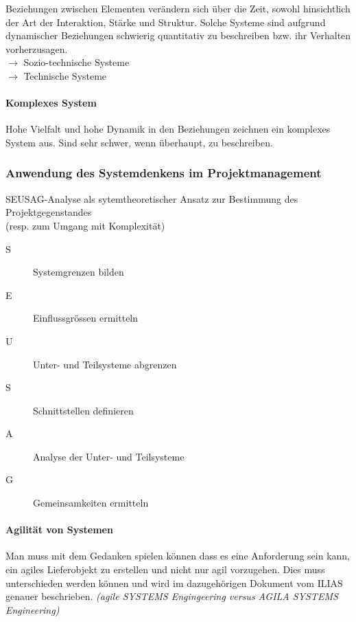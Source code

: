 \documentclass[a4paper]{article}
\begin{document}
			Beziehungen zwischen Elementen verändern sich über die Zeit, sowohl hinsichtlich der Art der Interaktion, Stärke und Struktur.
			Solche Systeme sind aufgrund dynamischer Beziehungen schwierig quantitativ zu beschreiben bzw. ihr Verhalten vorherzusagen.\\
			$\rightarrow$ Sozio-technische Systeme\\
			$\rightarrow$ Technische Systeme
			
			\paragraph{Komplexes System}
			
			Hohe Vielfalt und hohe Dynamik in den Beziehungen zeichnen ein komplexes System aus.
			Sind sehr schwer, wenn überhaupt, zu beschreiben.
			
		\subsubsection{Anwendung des Systemdenkens im Projektmanagement}
		
		SEUSAG-Analyse als sytemtheoretischer Ansatz zur Bestimmung des Projektgegenstandes\\ 
		(resp. zum Umgang mit Komplexität)
		\vspace{1em}
		\begin{description}
			\item[S] Systemgrenzen bilden
			\item[E] Einflussgrössen ermitteln
			\item[U] Unter- und Teilsysteme abgrenzen
			\item[S] Schnittstellen definieren
			\item[A] Analyse der Unter- und Teilsysteme
			\item[G] Gemeinsamkeiten ermitteln
		\end{description}
	
			\paragraph{Agilität von Systemen}
			
			Man muss mit dem Gedanken spielen können dass es eine Anforderung sein kann, ein agiles Lieferobjekt zu erstellen und nicht nur agil vorzugehen.
			Dies muss unterschieden werden können und wird im dazugehörigen Dokument vom ILIAS genauer beschrieben. \textit{(agile SYSTEMS Engingeering versus AGILA SYSTEMS Engineering)}
\end{document}
